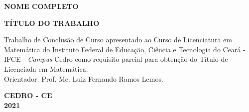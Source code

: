 \begin{titlepage}

\begin{center}
\textbf{NOME COMPLETO\\}
\vspace{7,5cm}

		\textbf{TÍTULO DO TRABALHO}\\

\vspace{2.5cm}

\vspace{2cm}
\begin{flushright}
	\begin{minipage}[l]{8cm}
		Trabalho de Conclusão de Curso apresentado ao Curso de Licenciatura em Matemática do Instituto Federal de Educação, Ciência e Tecnologia do Ceará -IFCE - {\it{Campus}} Cedro como requisito parcial para obtenção do Título de Licenciada em Matemática.\\
		Orientador: Prof. Me. Luiz Fernando Ramos Lemos.
	\end{minipage}
\end{flushright}

\end{center}

\vfill
\centering
		
			\textbf{CEDRO - CE \\2021}

\end{titlepage}




